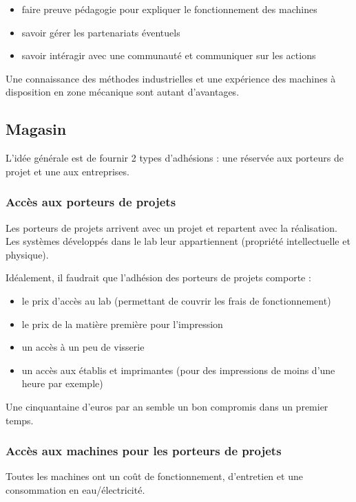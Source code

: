 \begin{itemize}
	\item faire preuve pédagogie pour expliquer le fonctionnement des machines
	\item savoir gérer les partenariats éventuels
	\item savoir intéragir avec une communauté et communiquer sur les actions
\end{itemize}

Une connaissance des méthodes industrielles et une expérience des machines à disposition en zone mécanique sont autant
d'avantages.

\subsection{Magasin}

L'idée générale est de fournir 2 types d'adhésions : une réservée aux porteurs de projet et une aux entreprises.

\subsubsection{Accès aux porteurs de projets}

Les porteurs de projets arrivent avec un projet et repartent avec la réalisation. Les systèmes développés dans le lab
leur appartiennent (propriété intellectuelle et physique).

Idéalement, il faudrait que l'adhésion des porteurs de projets comporte :

\begin{itemize}
	\item le prix d'accès au lab (permettant de couvrir les frais de fonctionnement)
	\item le prix de la matière première pour l'impression
	\item un accès à un peu de visserie
	\item un accès aux établis et imprimantes (pour des impressions de moins d'une heure par exemple)
\end{itemize}

Une cinquantaine d'euros par an semble un bon compromis dans un premier temps.

\subsubsection{Accès aux machines pour les porteurs de projets}

Toutes les machines ont un coût de fonctionnement, d'entretien et une consommation en eau/électricité.

